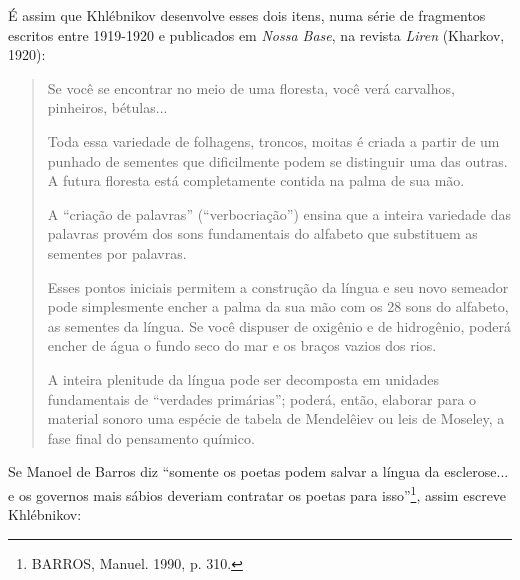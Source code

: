 É assim que Khlébnikov desenvolve esses dois itens, numa série de
fragmentos escritos entre 1919-1920 e publicados em \emph{Nossa Base},
na revista \emph{Liren} (Kharkov, 1920):

\begin{quote}
Se você se encontrar no meio de uma floresta, você verá carvalhos,
pinheiros, bétulas...

Toda essa variedade de folhagens, troncos, moitas é criada a partir de
um punhado de sementes que dificilmente podem se distinguir uma das
outras. A futura floresta está completamente contida na palma de sua
mão.

A ``criação de palavras'' (``verbocriação'') ensina que a inteira
variedade das palavras provém dos sons fundamentais do alfabeto que
substituem as sementes por palavras.

Esses pontos iniciais permitem a construção da língua e seu novo
semeador pode simplesmente encher a palma da sua mão com os 28 sons do
alfabeto, as sementes da língua. Se você dispuser de oxigênio e de
hidrogênio, poderá encher de água o fundo seco do mar e os braços vazios
dos rios.

A inteira plenitude da língua pode ser decomposta em unidades
fundamentais de ``verdades primárias''; poderá, então, elaborar para o
material sonoro uma espécie de tabela de Mendelêiev ou leis de Moseley,
a fase final do pensamento químico.
\end{quote}

Se Manoel de Barros diz ``somente os poetas podem salvar a língua da
esclerose... e os governos mais sábios deveriam contratar os poetas para
isso''\footnote{BARROS, Manuel. 1990, p. 310.}, assim escreve
Khlébnikov:

